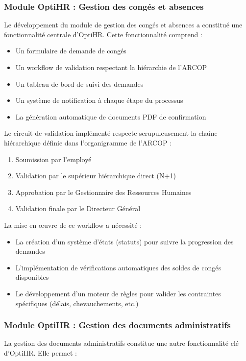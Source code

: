 \subsubsection{Module OptiHR : Gestion des congés et absences}
Le développement du module de gestion des congés et absences a constitué une fonctionnalité centrale d'OptiHR. Cette fonctionnalité comprend :

\begin{itemize}
    \item Un formulaire de demande de congés
    \item Un workflow de validation respectant la hiérarchie de l'ARCOP
    \item Un tableau de bord de suivi des demandes
    \item Un système de notification à chaque étape du processus
    \item La génération automatique de documents PDF de confirmation
\end{itemize}

Le circuit de validation implémenté respecte scrupuleusement la chaîne hiérarchique définie dans l'organigramme de l'ARCOP :

\begin{enumerate}
    \item Soumission par l'employé
    \item Validation par le supérieur hiérarchique direct (N+1)
    \item Approbation par le Gestionnaire des Ressources Humaines
    \item Validation finale par le Directeur Général
\end{enumerate}

La mise en œuvre de ce workflow a nécessité :

\begin{itemize}
    \item La création d'un système d'états (statuts) pour suivre la progression des demandes
    \item L'implémentation de vérifications automatiques des soldes de congés disponibles
    \item Le développement d'un moteur de règles pour valider les contraintes spécifiques (délais, chevauchements, etc.)
\end{itemize}

\subsubsection{Module OptiHR : Gestion des documents administratifs}
La gestion des documents administratifs constitue une autre fonctionnalité clé d'OptiHR. Elle permet :

